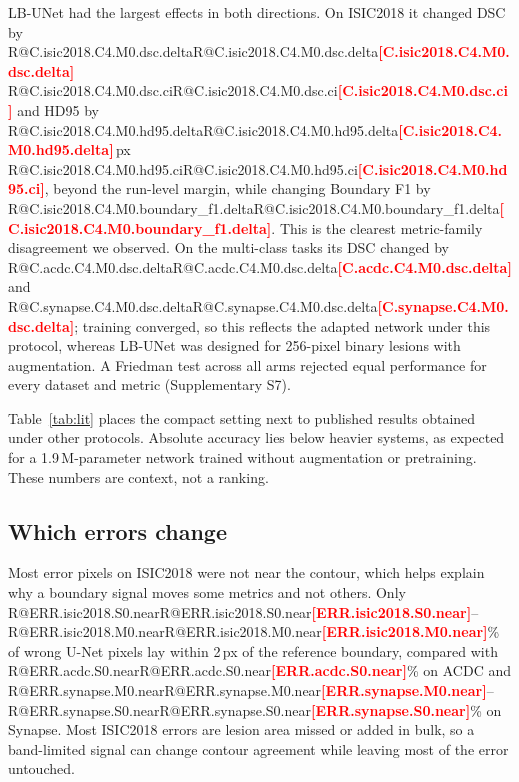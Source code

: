 \documentclass[fleqn,10pt,lineno]{wlpeerj}
\makeatletter
\newcommand{\R}[1]{\ifcsname R@#1\endcsname\csname R@#1\endcsname\else\textbf{\textcolor{red}{[#1]}}\fi}
\makeatother
\begin{document}
LB-UNet had the largest effects in both directions. On ISIC2018 it changed DSC by \R{C.isic2018.C4.M0.dsc.delta} \R{C.isic2018.C4.M0.dsc.ci} and HD95 by \R{C.isic2018.C4.M0.hd95.delta}\,px \R{C.isic2018.C4.M0.hd95.ci}, beyond the run-level margin, while changing Boundary F1 by \R{C.isic2018.C4.M0.boundary_f1.delta}. This is the clearest metric-family disagreement we observed. On the multi-class tasks its DSC changed by \R{C.acdc.C4.M0.dsc.delta} and \R{C.synapse.C4.M0.dsc.delta}; training converged, so this reflects the adapted network under this protocol, whereas LB-UNet was designed for 256-pixel binary lesions with augmentation. A Friedman test across all arms rejected equal performance for every dataset and metric (Supplementary S7).

Table~\ref{tab:lit} places the compact setting next to published results obtained under other protocols. Absolute accuracy lies below heavier systems, as expected for a 1.9\,M-parameter network trained without augmentation or pretraining. These numbers are context, not a ranking.

\begin{table}[ht]
\centering
\resizebox{0.92\linewidth}{!}{}
\caption{\label{tab:lit}Published results and this study. Not directly comparable: protocols differ in training data, pretraining (ImageNet for TransUNet and Swin-Unet), augmentation, and resolution. Published values were verified against the cited tables. Synapse and ACDC rows are volume-level; HD95 is in index units for this study and computed without spacing in the TransUNet code. ISIC2018 rows use the same official test set, but challenge entries had no restriction on models or data. A longer table is in Supplementary S7.}
\end{table}

\subsection*{Which errors change}
Most error pixels on ISIC2018 were not near the contour, which helps explain why a boundary signal moves some metrics and not others. Only \R{ERR.isic2018.S0.near}--\R{ERR.isic2018.M0.near}\% of wrong U-Net pixels lay within 2\,px of the reference boundary, compared with \R{ERR.acdc.S0.near}\% on ACDC and \R{ERR.synapse.M0.near}--\R{ERR.synapse.S0.near}\% on Synapse. Most ISIC2018 errors are lesion area missed or added in bulk, so a band-limited signal can change contour agreement while leaving most of the error untouched.
\end{document}
